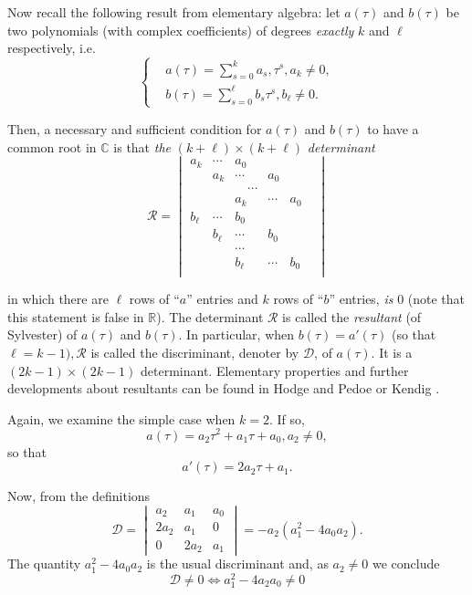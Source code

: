 Now recall the following result from elementary algebra: let $a(\tau)$ and $b(\tau)$ be two polynomials (with complex coefficients) of degrees {\em exactly} $k$ and $\ell$ respectively, i.e.
\begin{equation*}
\begin{cases}
& a(\tau) = \sum\limits_{s=0}^{k} a_{s}, \tau^{s}, a_{k} \neq 0,\\
& b(\tau) = \sum\limits_{s=0}^{\ell} b_{s} \tau^{s}, b_{\ell} \neq 0.
\end{cases}\tag{2.6}\label{chap2-eq2.6}
\end{equation*}

Then, a {necessary and sufficient condition} for $a(\tau)$ and $b(\tau)$ to have a common root in $\mathbb{C}$ is that {\em the} $(k + \ell) \times (k + \ell)$ {\em determinant}
\begin{equation*}
\mathscr{R} =
\begin{vmatrix}
a_{k} & \cdots &  a_{0} &&&\\
&  a_{k} & \cdots &   a_{0}&&\\
&&\quad \cdots &&& \\
&& a_{k} & \cdots &  a_{0}&\\
b_{\ell} & \cdots & b_{0}\\
& b_{\ell} & \cdots & b_{0}\\
 && \cdots & \\ 
&&b_{\ell} & \cdots & b_{0}&\\
\end{vmatrix}
\end{equation*}\pageoriginale

in which there are $\ell$ rows of ``$a$'' entries and $k$ rows of ``$b$'' entries, {\em is} 0 (note that this statement is false in $\mathbb{R}$). The determinant $\mathscr{R}$ is called the {\em resultant} (of Sylvester) of $a(\tau)$ and $b(\tau)$. In particular, when $b(\tau) = a'(\tau)$ (so that $\ell = k-1), \mathscr{R}$ is called the discriminant, denoter by $\mathscr{D}$, of $a(\tau)$. It is a $(2k-1) \times (2k-1)$ determinant. Elementary properties and further developments about resultants can be found in Hodge and Pedoe \cite{16} or Kendig \cite{18}.

Again, we examine the simple case when $k = 2$. If so, 
$$
a(\tau) = a_{2}\tau^{2} + a_{1}\tau + a_{0}, a_{2} \neq 0,
$$
so that
$$
a'(\tau) = 2a_{2}\tau + a_{1}.
$$

Now, from the definitions
\begin{equation*}
\mathscr{D} =
\begin{vmatrix}
a_{2} & a_{1} & a_{0}\\
2a_{2} & a_{1} & 0\\
0 &  2a_{2} & a_{1}
\end{vmatrix}
=-a_{2}(a_{1}^{2} - 4a_{0}a_{2}).
\end{equation*}\pageoriginale
The quantity $a_{1}^{2} - 4a_{0}a_{2}$ is the usual discriminant and, as $a_{2} \neq 0$ we conclude
\begin{equation*}
\mathscr{D} \neq 0 \Leftrightarrow a_{1}^{2} - 4a_{2}a_{0} \neq 0\tag{2.8}\label{chap2-eq2.8}
\end{equation*}

